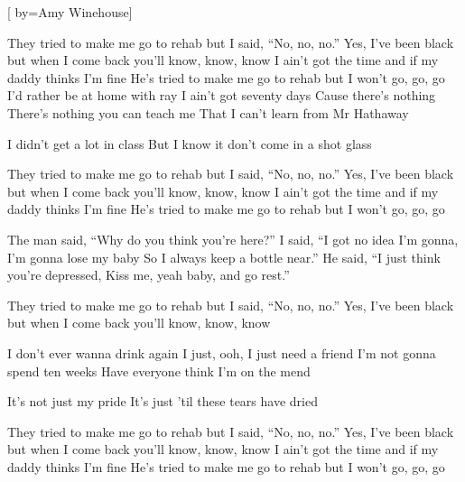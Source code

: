 [
	by={Amy Winehouse}]

\beginchorus
They tried to make me go to rehab but I said, ``No, no, no.''
Yes, I've been black but when I come back you'll know, know, know
I ain't got the time and if my daddy thinks I'm fine
He's tried to make me go to rehab but I won't go, go, go
\endchorus
\beginverse
I'd rather be at home with ray
I ain't got seventy days
Cause there's nothing
There's nothing you can teach me
That I can't learn from Mr Hathaway

I didn't get a lot in class
But I know it don't come in a shot glass
\endverse

\beginchorus
They tried to make me go to rehab but I said, ``No, no, no.''
Yes, I've been black but when I come back you'll know, know, know
I ain't got the time and if my daddy thinks I'm fine
He's tried to make me go to rehab but I won't go, go, go
\endchorus

\beginverse
The man said, ``Why do you think you're here?''
I said, ``I got no idea
I'm gonna, I'm gonna lose my baby
So I always keep a bottle near.''
He said, ``I just think you're depressed,
Kiss me, yeah baby, and go rest.''
\endverse

\beginchorus
They tried to make me go to rehab but I said, ``No, no, no.''
Yes, I've been black but when I come back you'll know, know, know
\endchorus

\beginverse
I don't ever wanna drink again
I just, ooh, I just need a friend
I'm not gonna spend ten weeks
Have everyone think I'm on the mend

It's not just my pride
It's just 'til these tears have dried
\endverse

\beginchorus
They tried to make me go to rehab but I said, ``No, no, no.''
Yes, I've been black but when I come back you'll know, know, know
I ain't got the time and if my daddy thinks I'm fine
He's tried to make me go to rehab but I won't go, go, go
\endchorus
\vspace{5cm}
\endsong